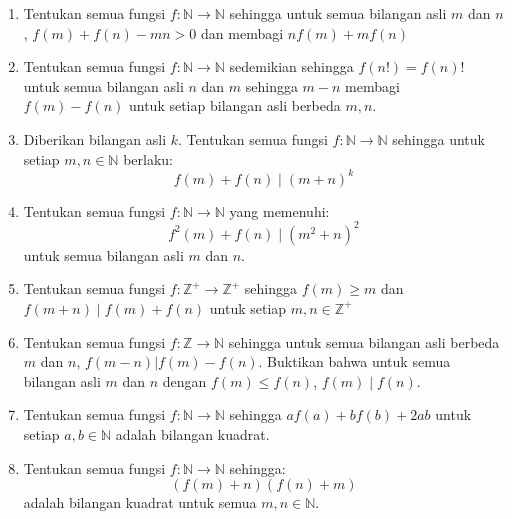 \documentclass[12pt]{scrartcl}
\begin{document}
\begin{enumerate}
    \item Tentukan semua fungsi $f : \mathbb{N} \to \mathbb{N}$ sehingga untuk semua bilangan asli $m$ dan $n$, $f(m) + f(n) - mn > 0$ dan membagi $nf(m) + mf(n)$
    
    \item Tentukan semua fungsi $f : \mathbb{N} \to \mathbb{N}$ sedemikian sehingga $f(n!) = f(n)!$ untuk semua bilangan asli $n$ dan $m$ sehingga $m - n$ membagi $f(m) - f(n)$ untuk setiap bilangan asli berbeda $m, n$.
    
    \item Diberikan bilangan asli $k$. Tentukan semua fungsi $f : \mathbb{N} \to \mathbb{N}$ sehingga untuk setiap $m, n \in \mathbb{N}$ berlaku:
    \[
    f(m)+f(n) \mid (m+n)^k
    \]
    
    \item Tentukan semua fungsi $f : \mathbb{N} \to \mathbb{N}$ yang memenuhi:
    \[
    f^2(m)+f(n) \mid (m^2+n)^2
    \]
    untuk semua bilangan asli $m$ dan $n$.
    
    \item Tentukan semua fungsi $f : \mathbb{Z}^+ \to \mathbb{Z}^+$ sehingga $f(m) \ge m$ dan $f(m+n) \mid f(m) + f(n)$ untuk setiap $m, n \in \mathbb{Z}^+$
    
    \item Tentukan semua fungsi $f : \mathbb{Z} \to \mathbb{N}$ sehingga untuk semua bilangan asli berbeda $m$ dan $n$, $f(m - n) | f(m) - f(n)$. Buktikan bahwa untuk semua bilangan asli $m$ dan $n$ dengan $f(m) \le f(n)$, $f(m) \mid f(n)$.
    
    \item Tentukan semua fungsi $f : \mathbb{N} \to \mathbb{N}$ sehingga $af(a) + bf(b) + 2ab$ untuk setiap $a, b \in \mathbb{N}$ adalah bilangan kuadrat.
    
    \item Tentukan semua fungsi $f : \mathbb{N} \to \mathbb{N}$ sehingga:
    \[
    (f(m)+n)(f(n)+m)
    \]
    adalah bilangan kuadrat untuk semua $m, n \in \mathbb{N}$.
\end{enumerate}
\end{document}
